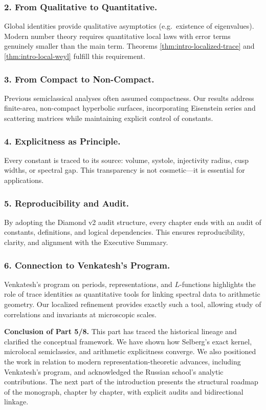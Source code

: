 \subsubsection*{2. From Qualitative to Quantitative.}
Global identities provide qualitative asymptotics (e.g.\ existence of eigenvalues).
Modern number theory requires quantitative local laws with error terms genuinely smaller than the main term.
Theorems \ref{thm:intro-localized-trace} and \ref{thm:intro-local-weyl}
fulfill this requirement.

\subsubsection*{3. From Compact to Non-Compact.}
Previous semiclassical analyses often assumed compactness.
Our results address finite-area, non-compact hyperbolic surfaces,
incorporating Eisenstein series and scattering matrices
while maintaining explicit control of constants.

\subsubsection*{4. Explicitness as Principle.}
Every constant is traced to its source: volume, systole, injectivity radius,
cusp widths, or spectral gap.
This transparency is not cosmetic—it is essential for applications.

\subsubsection*{5. Reproducibility and Audit.}
By adopting the Diamond v2 audit structure,
every chapter ends with an audit of constants, definitions, and logical dependencies.
This ensures reproducibility, clarity, and alignment with the Executive Summary.

\subsubsection*{6. Connection to Venkatesh’s Program.}
Venkatesh’s program on periods, representations, and $L$-functions
\cite{VenkateshProgram} highlights the role of trace identities
as quantitative tools for linking spectral data to arithmetic geometry.
Our localized refinement provides exactly such a tool,
allowing study of correlations and invariants at microscopic scales.

\medskip

\noindent\textbf{Conclusion of Part 5/8.}
This part has traced the historical lineage and clarified the conceptual framework.
We have shown how Selberg’s exact kernel,
microlocal semiclassics, and arithmetic explicitness converge.
We also positioned the work in relation to modern representation-theoretic advances,
including Venkatesh’s program, and acknowledged the Russian school’s analytic contributions.
The next part of the introduction presents the structural roadmap of the monograph,
chapter by chapter, with explicit audits and bidirectional linkage.


